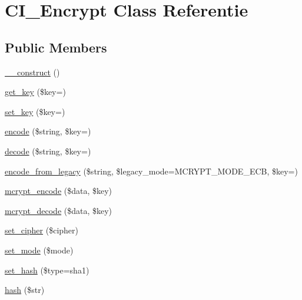 \hypertarget{class_c_i___encrypt}{}\section{C\+I\+\_\+\+Encrypt Class Referentie}
\label{class_c_i___encrypt}
\subsection*{Public Members}
\begin{DoxyCompactItemize}
\item 
\mbox{\hyperlink{class_c_i___encrypt_a095c5d389db211932136b53f25f39685}{\+\_\+\+\_\+construct}} ()
\item 
\mbox{\hyperlink{class_c_i___encrypt_a5ee53ce94c80d9259dee76cefdd2e948}{get\+\_\+key}} (\$key=\textquotesingle{}\textquotesingle{})
\item 
\mbox{\hyperlink{class_c_i___encrypt_ac8f224ccad805d0bcdf4ab7722058ae2}{set\+\_\+key}} (\$key=\textquotesingle{}\textquotesingle{})
\item 
\mbox{\hyperlink{class_c_i___encrypt_a6320fc999db614bc009690cc4867e238}{encode}} (\$string, \$key=\textquotesingle{}\textquotesingle{})
\item 
\mbox{\hyperlink{class_c_i___encrypt_a54562258204ebec3d699eed228c51199}{decode}} (\$string, \$key=\textquotesingle{}\textquotesingle{})
\item 
\mbox{\hyperlink{class_c_i___encrypt_a74e58407a40ff1f3d030a2065cf10182}{encode\+\_\+from\+\_\+legacy}} (\$string, \$legacy\+\_\+mode=M\+C\+R\+Y\+P\+T\+\_\+\+M\+O\+D\+E\+\_\+\+E\+CB, \$key=\textquotesingle{}\textquotesingle{})
\item 
\mbox{\hyperlink{class_c_i___encrypt_aa1d7e40f65deb526fe4619da65c6b1ec}{mcrypt\+\_\+encode}} (\$data, \$key)
\item 
\mbox{\hyperlink{class_c_i___encrypt_a85f02c928abbbc5a6bf038ea5292324d}{mcrypt\+\_\+decode}} (\$data, \$key)
\item 
\mbox{\hyperlink{class_c_i___encrypt_a6459059d757a362410feb13d96455747}{set\+\_\+cipher}} (\$cipher)
\item 
\mbox{\hyperlink{class_c_i___encrypt_ab32fd90a4ac2df4be1e56460d6f6daa3}{set\+\_\+mode}} (\$mode)
\item 
\mbox{\hyperlink{class_c_i___encrypt_aa7cef093f6581d1dbeecdf815c7fd8b2}{set\+\_\+hash}} (\$type=\textquotesingle{}sha1\textquotesingle{})
\item 
\mbox{\hyperlink{class_c_i___encrypt_aea8db0058c00fd2bc1351ddb2ebf3191}{hash}} (\$str)
\end{DoxyCompactItemize}
